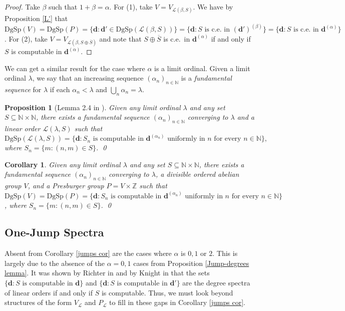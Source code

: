 \documentclass{amsart}%
\numberwithin{theorem}{section}
\newtheorem{corollary}[theorem]{Corollary}
\newtheorem{proposition}[theorem]{Proposition}
\newcommand{\Z}{\mathbb{Z}}
\newcommand{\N}{\mathbb{N}}
\newcommand{\0}{\emptyset}
\newcommand{\ddd}{\boldsymbol{d}}
\newcommand{\LL}{\mathcal{L}}
\newcommand{\dgsp}{\text{DgSp}}
\begin{document}
\begin{proof}
    Take $\beta$ such that $1+\beta= \alpha$. For (1), take $V=V_{\LL(\beta,S)}$. We have by Proposition \ref{L'} that $\dgsp(V)=\dgsp(P)=\{\ddd: \ddd'\in \dgsp(\LL(\beta,S))\}=\{\ddd: S \text{ is c.e.\ in }(\ddd')^{(\beta)}\} = \{\ddd:S \text{ is c.e.\ in } \ddd^{(\alpha)}\} $.  For (2), take $V=V_{\LL(\beta, S \oplus \overline{S})}$ and note that $S\oplus \overline{S}$ is c.e.\ in $\ddd^{(\alpha)}$ if and only if $S$ is computable in $\ddd^{(\alpha)}$. 
\end{proof}

We can get a similar result for the case where $\alpha$ is a limit ordinal. Given a limit ordinal $\lambda$, we say that an increasing sequence $(\alpha_n)_{n\in \N}$ is a \emph{fundamental sequence} for $\lambda$ if each $\alpha_n<\lambda$ and $\bigcup_n \alpha_n=\lambda$. 

\begin{proposition}[Lemma 2.4 in \cite{Jump-degrees}] Given any limit ordinal $\lambda$ and any set $S\subseteq \N\times \N$, there exists a fundamental sequence $(\alpha_n)_{n\in \N}$ converging to $\lambda$ and a linear order $\LL(\lambda,S)$ such that $$\dgsp(\LL(\lambda,S))=\{\ddd: S_n \text{ is computable in $\ddd^{(\alpha_n)}$ uniformly in $n$ for every $n\in \N$}\},$$ where $S_n=\{m:(n,m)\in S\}$. \qed

\end{proposition}

\begin{corollary}
\label{limit cor}
    Given any limit ordinal $\lambda$ and any set $S\subseteq \N\times \N$, there exists a fundamental sequence $(\alpha_n)_{n\in \N}$ converging to $\lambda$, a divisible ordered abelian group $V$, and a Presburger group $P=V\times \Z$ such that $\dgsp(V)=\dgsp(P)=\{\ddd: S_n \text{ is computable in $\ddd^{(\alpha_n)}$ uniformly in $n$ for every $n\in \N$}\}$, where $S_n=\{m:(n,m)\in S\}$. \qed
\end{corollary}

\subsection{One-Jump Spectra} 

Absent from Corollary \ref{jumps cor} are the cases where $\alpha$ is $0, 1$ or $2$. This is largely due to the absence of the $\alpha=0,1$ cases from Proposition \ref{Jump-degrees lemma}. It was shown by Richter in \cite{Richter_1981} and by Knight in \cite{Knight_1986} that the sets $\{\ddd: S \text{ is computable in } \ddd\}$ and $\{\ddd: S \text{ is computable in } \ddd'\}$ are the degree spectra of linear orders if and only if $S$ is computable. Thus, we must look beyond structures of the form $V_\LL$ and $P_\LL$ to fill in these gaps in Corollary \ref{jumps cor}. 
\end{document}
